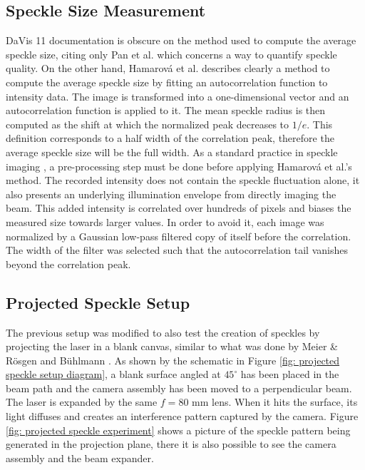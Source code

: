 \subsection{Speckle Size Measurement}
\label{subsection: speckle size measurement}

\par DaVis 11 documentation is obscure on the method used to compute the average speckle size, citing only Pan et al. which concerns a way to quantify speckle quality. On the other hand, Hamarová et al. \cite{Hamarova2016} describes clearly a method to compute the average speckle size by fitting an autocorrelation function to intensity data. The image is transformed into a one-dimensional vector and an autocorrelation function is applied to it. The mean speckle radius is then computed as the shift at which the normalized peak decreases to $1/e$. This definition corresponds to a half width of the correlation peak, therefore the average speckle size will be the full width. As a standard practice in speckle imaging \cite{Shi2023,Zhu2025}, a pre-processing step must be done before applying Hamarová et al.'s method. The recorded intensity does not contain the speckle fluctuation alone, it also presents an underlying illumination envelope from directly imaging the beam. This added intensity is correlated over hundreds of pixels and biases the measured size towards larger values. In order to avoid it, each image was normalized by a Gaussian low-pass filtered copy of itself before the correlation. The width of the filter was selected such that the autocorrelation tail vanishes beyond the correlation peak.


\subsection{Projected Speckle Setup}
\label{subsection: projected speckle setup}

The previous setup was modified to also test the creation of speckles by projecting the laser in a blank canvas, similar to what was done by Meier \& Rösgen and Bühlmann \cite{Meier&Roesgen2013,Buhlmann2020}. As shown by the schematic in Figure \ref{fig: projected speckle setup diagram}, a blank surface angled at $45^{\circ}$ has been placed in the beam path and the camera assembly has been moved to a perpendicular beam. The laser is expanded by the same $f=80$ mm lens. When it hits the surface, its light diffuses and creates an interference pattern captured by the camera. Figure \ref{fig: projected speckle experiment} shows a picture of the speckle pattern being generated in the projection plane, there it is also possible to see the camera assembly and the beam expander.

